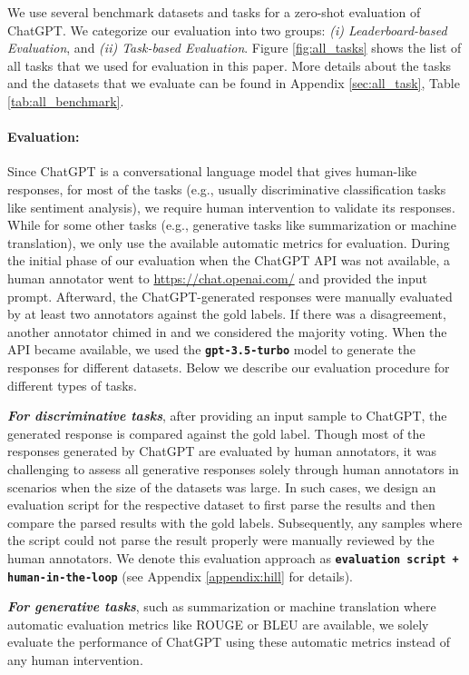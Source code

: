 \documentclass[11pt]{article}
\begin{document}
We use several benchmark datasets and tasks for a zero-shot evaluation of ChatGPT. We categorize our evaluation into two groups: \textit{(i) Leaderboard-based Evaluation}, and \textit{(ii) Task-based Evaluation}. Figure \ref{fig:all_tasks} shows the list of all tasks that we used for evaluation in this paper. More details about the tasks and the datasets that we evaluate can be found in Appendix \ref{sec:all_task}, Table \ref{tab:all_benchmark}.  

\paragraph{Evaluation:} Since ChatGPT is a conversational language model that gives human-like responses, for most of the tasks (e.g., usually discriminative classification tasks like sentiment analysis), we require human intervention to validate its responses. While for some other tasks (e.g., generative tasks like summarization or machine translation), we only use the available automatic metrics for evaluation. During the initial phase of our evaluation when the ChatGPT API was not available, a human annotator went to \url{https://chat.openai.com/} and provided the input prompt. Afterward, the ChatGPT-generated responses were manually evaluated by at least two annotators against the gold labels. If there was a disagreement, another annotator chimed in and we considered the majority voting. When the API became available, we used the \textbf{\texttt{gpt-3.5-turbo}} model to generate the responses for different datasets. Below we describe our evaluation procedure for different types of  tasks. 

\textbf{\textit{For discriminative tasks}}, after providing an input sample to ChatGPT, the generated response is compared against the gold label. Though most of the responses generated by ChatGPT are evaluated by human annotators, it was challenging to assess all generative responses solely through human annotators in scenarios when the size of the datasets was large. In such cases, we design an evaluation script for the respective dataset to first parse the results and then compare the parsed results with the gold labels. Subsequently, any samples where the script could not parse the result properly were manually reviewed by the human annotators. We denote this evaluation approach as \textbf{\texttt{evaluation script + human-in-the-loop}} (see Appendix \ref{appendix:hill} for details).

\textbf{\textit{For generative tasks}}, such as summarization or machine translation where automatic evaluation metrics like ROUGE \cite{lin2004rouge} or BLEU \cite{papineni2002bleu} are available, we solely evaluate the performance of ChatGPT using these automatic metrics instead of any human intervention. 
\end{document}

